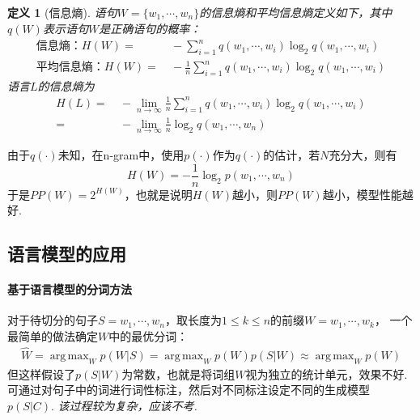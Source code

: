 \documentclass[12pt, a4paper, oneside]{ctexart}
\newtheorem{definition}{定义}
\numberwithin{equation}{section}  %
\DeclareMathOperator*{\argmax}{arg\,max}  %
\let\leq=\leqslant %
\begin{document}
\begin{definition}[信息熵]
    语句$W = \{w_1,\cdots, w_n\}$的信息熵和平均信息熵定义如下，其中$q(W)$表示语句$W$是正确语句的概率：
    \begin{align*}
        \text{信息熵：} H(W) =&\ -\sum_{i=1}^nq(w_1,\cdots, w_i)\log_2q(w_1,\cdots, w_i)\\
        \text{平均信息熵：} H(W) =&\ -\frac{1}{n}\sum_{i=1}^nq(w_1,\cdots, w_i)\log_2q(w_1,\cdots, w_i)
    \end{align*}
    语言$L$的信息熵为
    \begin{align*}
        H(L) =&\ -\lim_{n\to\infty}\frac{1}{n}\sum_{i=1}^nq(w_1,\cdots,w_i)\log_2q(w_1,\cdots,w_i)\\
        =&\ -\lim_{n\to\infty}\frac{1}{n}\log_2q(w_1,\cdots,w_n)
    \end{align*}
\end{definition}
由于$q(\cdot)$未知，在n-gram中，使用$p(\cdot)$作为$q(\cdot)$的估计，若$N$充分大，则有
\begin{equation*}
    H(W) = -\frac{1}{n}\log_2p(w_1,\cdots,w_n)
\end{equation*}
于是$PP(W) = 2^{H(W)}$，也就是说明$H(W)$越小，则$PP(W)$越小，模型性能越好.
\subsection{语言模型的应用}
\paragraph{基于语言模型的分词方法}
对于待切分的句子$S = {w_1,\cdots,w_n}$，取长度为$1\leq k\leq n$的前缀$W = {w_1,\cdots,w_k}$，
一个最简单的做法确定$W$中的最优分词：
\begin{align*}
    \widehat{W} = \argmax_{W}p(W|S) = \argmax_{W}p(W)p(S|W) \approx \argmax_{W}p(W)
\end{align*}
但这样假设了$p(S|W)$为常数，也就是将词组$W$视为独立的统计单元，效果不好. 可通过对句子中的词进行词性标注，然后对不同标注设定不同的生成模型
$p(S|C)$. \textit{该过程较为复杂，应该不考.}
\end{document}
